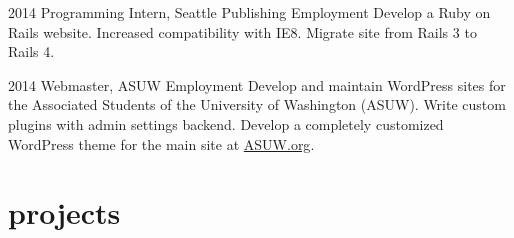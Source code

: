 \documentclass[]{friggeri-cv}
\begin{document}
\begin{entrylist}
  \entry 
    {2014}
    {Programming Intern, Seattle Publishing}
    {Employment}
    {Develop a Ruby on Rails website. Increased compatibility with IE8. Migrate site from Rails 3 to Rails 4.}
  
  \entry
    {2014}
    {Webmaster, ASUW}
    {Employment}
    {Develop and maintain WordPress sites for the Associated Students of the University of Washington (ASUW). Write custom plugins with admin settings backend. Develop a completely customized WordPress theme for the main site at \href{http://asuw.org}{ASUW.org}.}
    
\end{entrylist}

\section{projects}
\end{document}
